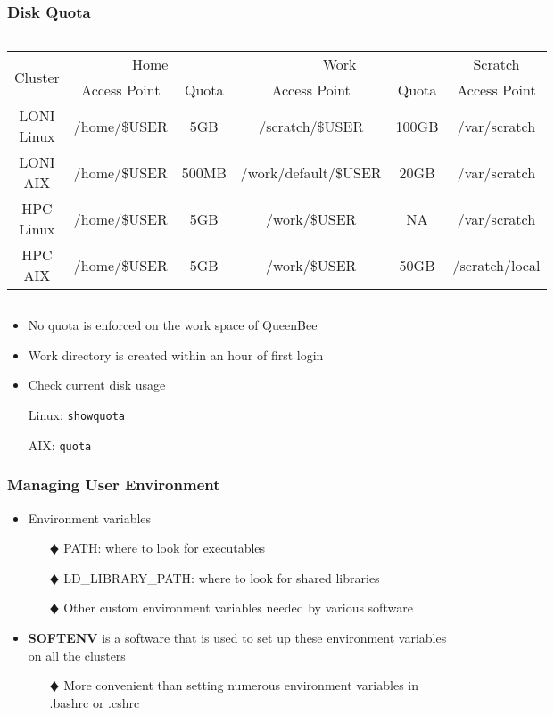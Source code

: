 \documentclass[slidestop,mathserif,compress,xcolor=svgnames,table]{beamer}
\begin{document}
\begin{frame}
\frametitle{\small Disk Quota}
{\scriptsize
\begin{columns}
\column{12cm}
\begin{block}{}
\begin{center}
\begin{tabular}{|c|c|c|c|c|c|}
\hline
\multirow{2}{*}{Cluster} & \multicolumn{2}{c|}{Home} & \multicolumn{2}{c|}{Work} & Scratch \\
\cline{2-6}
 & Access Point & Quota & Access Point & Quota & Access Point \\
\hline
LONI Linux & /home/\$USER & 5GB & /scratch/\$USER & 100GB & /var/scratch\\
\hline
LONI AIX & /home/\$USER & 500MB & /work/default/\$USER & 20GB & /var/scratch\\
\hline
HPC Linux & /home/\$USER & 5GB & /work/\$USER & NA & /var/scratch\\
\hline
HPC AIX & /home/\$USER & 5GB & /work/\$USER & 50GB & /scratch/local\\
\hline
\end{tabular}
\end{center}
\end{block}
\end{columns}
}
{\footnotesize
\begin{itemize}
\item No quota is enforced on the work space of QueenBee
\item Work directory is created within an hour of first login
\item Check current disk usage
\item[] Linux: \texttt{showquota}
\item[] AIX: \texttt{quota}
\end{itemize}
}
\end{frame}

\begin{frame}
\frametitle{\small Managing User Environment}
\begin{itemize}
\item Environment variables
\begin{enumerate}
\item[$\vardiamond$]PATH: where to look for executables
\item[$\vardiamond$]LD\_LIBRARY\_PATH: where to look for shared libraries
\item[$\vardiamond$]Other custom environment variables needed by various software
\end{enumerate}
\item {\bf SOFTENV} is a software that is used to set up these environment variables on all the clusters
\begin{enumerate}
\item[$\vardiamond$]More convenient than setting numerous environment variables in .bashrc or .cshrc
\end{enumerate}
\end{itemize}
\end{frame}
\end{document}
